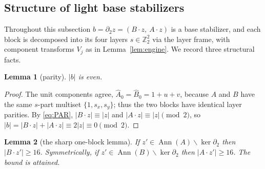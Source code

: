 \documentclass[11pt]{article}
\newcommand{\Z}{\mathbb{Z}}
\newcommand{\wt}[1]{\lvert #1\rvert}
\DeclareMathOperator{\Ann}{Ann}
\newcommand{\hA}{\hat{A}}
\newcommand{\hB}{\hat{B}}
\theoremstyle{plain}
\newtheorem{lemma}{Lemma}[section]
\theoremstyle{definition}
\theoremstyle{remark}
\begin{document}
\subsection{Structure of light base stabilizers}\label{subsec:structure}

Throughout this subsection $b=\partial_2 z=(B\cdot z,\ A\cdot z)$ is a base stabilizer,
and each block is decomposed into its four layers $s\in\Z_2^2$ via the layer frame, with
component transforms $V_j$ as in Lemma~\ref{lem:engine}. We record three structural
facts.

\begin{lemma}[parity]\label{lem:parity}
$\wt{b}$ is even.
\end{lemma}

\begin{proof}
The unit components agree, $\hA_0=\hB_0=1+u+v$, because $A$ and $B$ have the same
$s$-part multiset $\{1,s_x,s_y\}$; thus the two blocks have identical layer parities. By
\eqref{eq:PAR}, $\wt{B\cdot z}\equiv\wt z$ and $\wt{A\cdot z}\equiv\wt z\pmod 2$, so
$\wt{b}=\wt{B\cdot z}+\wt{A\cdot z}\equiv 2\wt z\equiv 0\pmod 2$.
\end{proof}

\begin{lemma}[the sharp one-block lemma]\label{lem:oneblock}
If $z'\in\Ann(A)\smallsetminus\ker\partial_2$ then $\wt{B\cdot z'}\ge 16$. Symmetrically,
if $z'\in\Ann(B)\smallsetminus\ker\partial_2$ then $\wt{A\cdot z'}\ge 16$. The bound is
attained.
\end{lemma}
\end{document}
